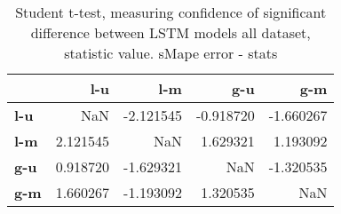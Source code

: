 \begin{table}[h]
\centering
\caption{Student t-test, measuring confidence of significant difference between LSTM models all dataset, statistic value. sMape error - stats}
\label{table:ttest-stats-lstm-experiments-sMAPE-all-dataset}
\begin{tabular}{lrrrr}
\toprule
{} &       l-u &       l-m &       g-u &       g-m \\
\midrule
\textbf{l-u} &       NaN & -2.121545 & -0.918720 & -1.660267 \\
\textbf{l-m} &  2.121545 &       NaN &  1.629321 &  1.193092 \\
\textbf{g-u} &  0.918720 & -1.629321 &       NaN & -1.320535 \\
\textbf{g-m} &  1.660267 & -1.193092 &  1.320535 &       NaN \\
\bottomrule
\end{tabular}
\end{table}
